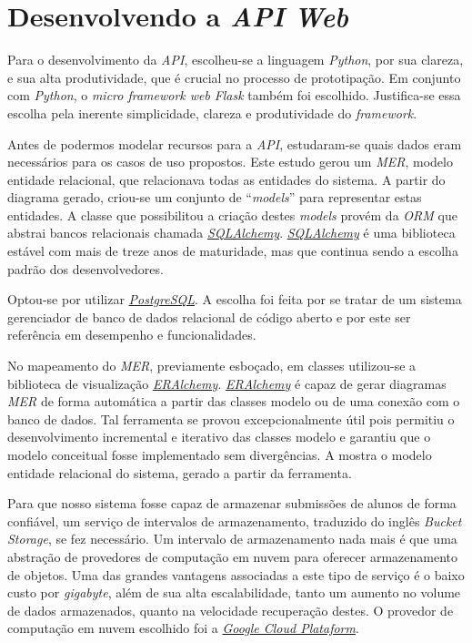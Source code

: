 \section{Desenvolvendo a \emph{API} \emph{Web}}
Para o desenvolvimento da \emph{API}, escolheu-se a linguagem \emph{Python}, por sua clareza, 
e sua alta produtividade, que é crucial no processo de prototipação. Em conjunto com \emph{Python}, 
o \emph{micro framework web} \emph{Flask} também foi escolhido. Justifica-se essa escolha pela
inerente simplicidade, clareza e produtividade do \emph{framework}. 

Antes de podermos modelar recursos para a \emph{API},
estudaram-se quais dados eram necessários para os casos de uso propostos. Este estudo gerou um 
\emph{MER}, modelo entidade relacional, que relacionava todas as entidades do sistema. A partir 
do diagrama gerado, criou-se um conjunto de ``\emph{models}'' para representar estas entidades. A classe 
que possibilitou a criação destes \emph{models} provém da \emph{ORM} que abstrai bancos 
relacionais chamada \hyperref[link:sqlalchemy]{\emph{SQLAlchemy}}. \hyperref[link:sqlalchemy]{\emph{SQLAlchemy}}
é uma biblioteca estável com mais de treze anos de maturidade,
mas que continua sendo a escolha padrão dos desenvolvedores.

Optou-se por utilizar \hyperref[link:postgresql]{\emph{PostgreSQL}}.
A escolha foi feita por se tratar de um sistema 
gerenciador de banco de dados relacional de código aberto e por este ser referência em 
desempenho e funcionalidades.

No mapeamento do \emph{MER}, previamente esboçado, em classes utilizou-se a biblioteca 
de visualização \hyperref[link:eralchemy]{\emph{ERAlchemy}}. \hyperref[link:eralchemy]{\emph{ERAlchemy}} é capaz de gerar 
diagramas \emph{MER} de forma automática a partir das classes modelo ou de uma conexão com o banco de dados. 
Tal ferramenta se provou excepcionalmente útil pois permitiu o desenvolvimento incremental e iterativo das 
classes modelo e garantiu que o modelo conceitual fosse implementado sem divergências. A  mostra 
o modelo entidade relacional do sistema, gerado a partir da ferramenta.

Para que nosso sistema fosse capaz de armazenar submissões de alunos de forma confiável,  
um serviço de intervalos de  armazenamento, traduzido do inglês \emph{Bucket Storage}, se 
fez necessário. Um intervalo de armazenamento nada mais é que uma abstração de provedores 
de computação em nuvem para oferecer armazenamento de objetos. Uma das grandes vantagens associadas 
a este tipo de serviço é o baixo custo por \emph{gigabyte}, além de sua alta escalabilidade, tanto 
 um aumento no volume de dados armazenados, quanto na velocidade recuperação destes.
O provedor de computação em nuvem escolhido foi a \hyperref[link:gcp]{\emph{Google Cloud Plataform}}.


